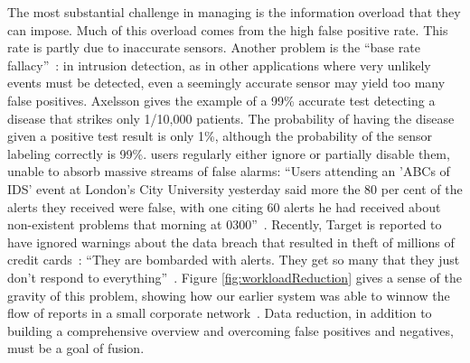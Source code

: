 The most substantial challenge in managing \idses is the information overload
that they can impose.
Much of this overload comes from the high false positive rate.  This rate is
partly due to
inaccurate sensors.
Another problem is the ``base rate fallacy''~\cite{Axelsson:1999:BFI:319709.319710}:
in intrusion detection, as in
other applications where very unlikely events must be detected, even a seemingly
accurate sensor may yield too many false positives.  Axelsson gives the example
of a 99\% accurate test detecting a disease that strikes only 1/10,000
patients.  The probability of having the disease given a positive test result is
only 1\%, although the probability of the sensor labeling correctly is 99\%.
{\ids} users regularly either ignore or partially disable them, unable to absorb
massive streams of false alarms:
``Users attending an 'ABCs of IDS' event at London's City University yesterday
  said more the 80 per cent of the alerts they received were false, with one
  citing 60 alerts he had received about non-existent problems that morning at
  0300''~\cite{Register}.
Recently, Target is reported to have ignored warnings about the
data breach that resulted in theft of millions of credit
cards~\cite{TargetIgnoredIDS}:
``They are bombarded with alerts. They get so many that they just don't respond
to everything''~\cite{finkle14:_target}.
Figure
\ref{fig:workloadReduction} gives a sense of the gravity of this
problem, showing how our earlier system was able to winnow
the 
flow of reports in a small corporate network~.
Data reduction, in addition to building a comprehensive overview
and overcoming false positives and negatives, must be a goal of \ids fusion.
